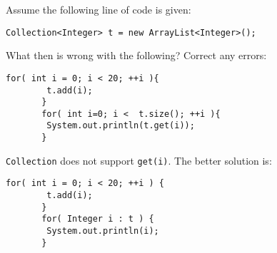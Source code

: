 Assume the following line of code is given:
\begin{lstlisting}[numbers=none]
	Collection<Integer> t = new ArrayList<Integer>();
\end{lstlisting}

What then is wrong with the following? Correct any errors:
\begin{lstlisting}[numbers=none]
	for( int i = 0; i < 20; ++i ){
		t.add(i);
       }
       for( int i=0; i <  t.size(); ++i ){
		System.out.println(t.get(i));
       }
\end{lstlisting}

\begin{answer}
\texttt{Collection} does not support \texttt{get(i)}. The better solution is:
\begin{lstlisting}[numbers=none]
	for( int i = 0; i < 20; ++i ) {
		t.add(i);
       }
       for( Integer i : t ) {
		System.out.println(i);
       }
\end{lstlisting}
\end{answer}

